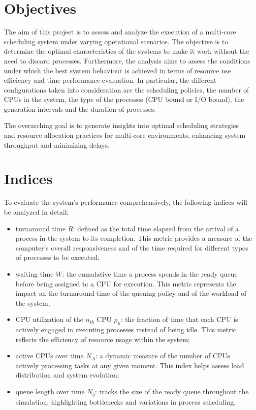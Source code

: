 \section{Objectives}

The aim of this project is to assess and analyze the execution of a multi-core scheduling system under varying operational scenarios. The objective is to determine the optimal characteristics of the systems to make it work without the need to discard processes. Furthermore, the analysis aims to assess the conditions under which the best system behaviour is achieved in terms of resource use efficiency and time performance evaluation. In particular, the different configurations taken into consideration are the scheduling policies, the number of CPUs in the system, the type of the processes (CPU bound or I/O bound), the generation intervals and the duration of processes.

The overarching goal is to generate insights into optimal scheduling strategies and resource allocation practices for multi-core environments, enhancing system throughput and minimizing delays.


\section{Indices}

To evaluate the system’s performance comprehensively, the following indices will be analyzed in detail:
\begin{itemize}
    \item turnaround time $R$: defined as the total time elapsed from the arrival of a process in the system to its completion. This metric provides a measure of the computer’s overall responsiveness and of the time required for different types of processes to be executed;
    \item waiting time $W$: the cumulative time  a process spends in the ready queue before being assigned to a CPU for execution. This metric represents the impact on the turnaround time of the queuing policy and of the workload of the system;
    \item CPU utilization of the $n_{th}$ CPU $\rho_n$: the fraction of time that each CPU is actively engaged in executing processes instead of being idle. This metric reflects the efficiency of resource usage within the system;
    \item active CPUs over time $N_A$: a dynamic measure of the number of CPUs actively processing tasks at any given moment. This index helps assess load distribution and system evolution;
    \item queue length over time $N_q$: tracks the size of the ready queue throughout the simulation, highlighting bottlenecks and variations in process scheduling.
\end{itemize}

